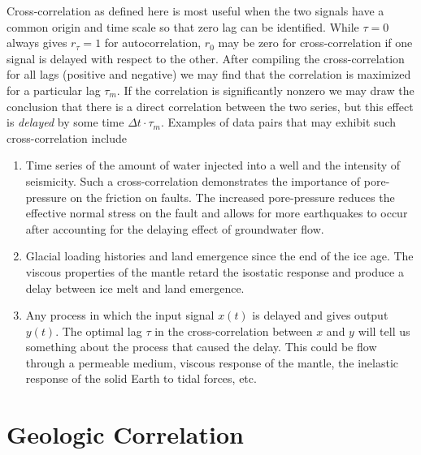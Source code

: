 
Cross-correlation as defined here is most useful when the two signals have a common origin and 
time scale so that zero lag can be identified.  While $\tau = 0$ always gives $r_\tau = 1$ for autocorrelation, 
$r_0$  may be zero for cross-correlation if one signal is delayed with respect to the other.   After 
compiling the cross-correlation for all lags (positive and negative) we may find that the 
correlation is maximized for a particular lag $\tau _m$. If the correlation is significantly  nonzero we may 
draw the conclusion that there is a direct correlation between the two series, but this effect is 
\emph{delayed} by some time $\Delta t \cdot \tau_m$.   Examples of data pairs that may exhibit 
such cross-correlation include
\begin{enumerate}
\item	Time series of the amount of water injected into a well and the intensity of seismicity.  Such 
a cross-correlation demonstrates the importance of pore-pressure on the friction on faults.  
The increased pore-pressure reduces the effective normal stress on the fault and allows 
for more earthquakes to occur after accounting for the delaying effect of groundwater flow.

\item Glacial loading histories and land emergence since the end of the ice age.  The viscous properties
of the mantle retard the isostatic response and produce a delay between ice melt and land emergence.

\item	Any process in which the input signal $x(t)$ is delayed and gives output $y(t)$.  The optimal 
lag $\tau$ in the cross-correlation between $x$ and $y$ will tell us something about  the process that 
caused the delay.  This could be flow through a permeable medium, viscous response of 
the mantle, the inelastic response of the solid Earth to tidal forces, etc.
\end{enumerate}

\section{Geologic Correlation}


